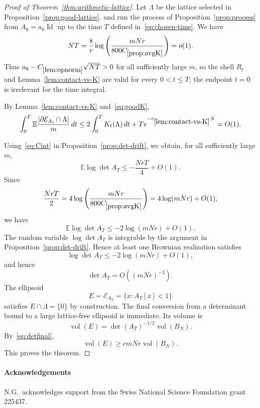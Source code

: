 \documentclass[11pt]{article}
\theoremstyle{remark}
\newcommand{\vol}{\operatorname{vol}}
\newcommand{\Id}{\operatorname{Id}}
\newcommand{\E}{\mathbb E}
\newcommand{\calE}{\mathcal E}
\begin{document}
\begin{proof}[Proof of Theorem~\ref{thm:arithmetic-lattice}]
Let $\Lambda$ be the lattice selected in Proposition~\ref{prop:good-lattice},
and run the process of Proposition~\ref{prop:process} from $A_0=a_0\Id$ up to
the time $T$ defined in~\eqref{eq:chosen-time}.  We have
\[
        NT=\frac8r\log\left(\frac{mNr}{800C_{\ref{prop:avgK}}}\right)=o(1).
\]
Thus $a_0-C_{\ref{lem:opnorm}}\sqrt{NT}>0$ for all sufficiently large $m$, so the
shell $R_t$ and Lemma~\ref{lem:contact-vs-K} are valid for every $0<t\le T$;
the endpoint $t=0$ is irrelevant for the time integral.

By Lemma~\ref{lem:contact-vs-K} and~\eqref{eq:goodK},
\begin{equation}
        \int_0^T\E
        \frac{|\partial\calE_{A_t}\cap\Lambda|}{m}\,dt
        \le 2\int_0^T K_t(\Lambda)\,dt
        +Te^{-c_{\ref{lem:contact-vs-K}}N}
        =O(1).
\label{eq:Cint}
\end{equation}

Using~\eqref{eq:Cint} in Proposition~\ref{prop:det-drift}, we obtain, for all
sufficiently large $m$,
\[
        \E\log\det A_T
        \le -\frac{NrT}{4}+O(1).
\]
Since
\[
        \frac{NrT}{2}=4\log\left(\frac{mNr}{800C_{\ref{prop:avgK}}}\right)
        =4\log(mNr)+O(1),
\]
we have
\[
        \E\log\det A_T
        \le -2\log(mNr)+O(1).
\]
The random variable $\log\det A_T$ is integrable by the argument in
Proposition~\ref{prop:det-drift}.  Hence at least one Brownian realization
satisfies
\[
        \log\det A_T\le -2\log(mNr)+O(1),
\]
and hence
\begin{equation}
        \det A_T=O\left((mNr)^{-2}\right).
\label{eq:detfinal}
\end{equation}
The ellipsoid
\[
        E=\calE_{A_T}=\{x:A_T[x]<1\}
\]
satisfies $E\cap\Lambda=\{0\}$ by construction.  The final conversion from a
determinant bound to a large lattice-free ellipsoid is immediate.  Its
volume is
\[
        \vol(E)=\det(A_T)^{-1/2}\vol(B_N).
\]
By~\eqref{eq:detfinal},
\[
        \vol(E)
        \ge cmNr\vol(B_N).
\]
This proves the theorem.
\end{proof}


\paragraph*{Acknowledgements}

N.G.\ acknowledges support from the Swiss National Science Foundation grant 225437.
\end{document}
